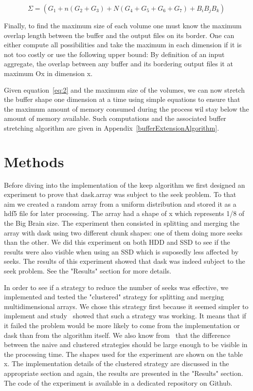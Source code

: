 \documentclass[conference]{IEEEtran}
\begin{document}
\begin{equation} \label{eq:2}
\Sigma = (G_1 + n(G_2 + G_3) + N(G_4 + G_5 + G_6 + G_7) + B_iB_jB_k)
\end{equation}

Finally, to find the maximum size of each volume one must know the maximum
overlap length between the buffer and the output files on its border. One can
either compute all possibilities and take the maximum in each dimension if it is
not too costly or use the following upper bound: By definition of an input
aggregate, the overlap between any buffer and its bordering output files it at
maximum Ox in dimension x.

Given equation~\ref{eq:2} and the maximum size of the volumes, we can now
stretch the buffer shape one dimension at a time using simple equations to ensure
that the maximum amount of memory consumed during the process wil stay below the
amount of memory available. Such computations and the associated buffer stretching
algorithm are given in Appendix~\ref{bufferExtensionAlgorithm}.

\section{Methods}

Before diving into the implementation of the keep algorithm we first designed
an experiment to prove that dask.array was subject to the seek problem. To that
aim we created a random array from a uniform distribution and stored it as a
hdf5 file for later processing. The array had a shape of x which represents 1/8
of the Big Brain size. The experiment then consisted in splitting and merging
the array with dask using two different chunk shapes: one of them doing more
seeks than the other. We did this experiment on both HDD and SSD to see if the
results were also visible when using an SSD which is suposedly less affected by
seeks. The results of this experiment showed that dask was indeed subject to the
seek problem. See the "Results" section for more details.

In order to see if a strategy to reduce the number of seeks was effective, we
implemented and tested the "clustered" strategy for splitting and merging
multidimensional arrays. We chose this strategy first because it seemed simpler
to implement and study~\cite{seqalgorithms} showed that such a strategy was
working. It means that if it failed the problem would be more likely to come
from the implementation or dask than from the algorithm itself. We also know
from~\cite{seqalgorithms} that the difference between the naive and clustered
strategies should be large enough to be visible in the processing time. The
shapes used for the experiment are shown on the table x. The implementation
details of the clustered strategy are discussed in the appropriate section and
again, the results are presented in the "Results" section. The code of the
experiment is available in a dedicated repository on Github.
\end{document}
